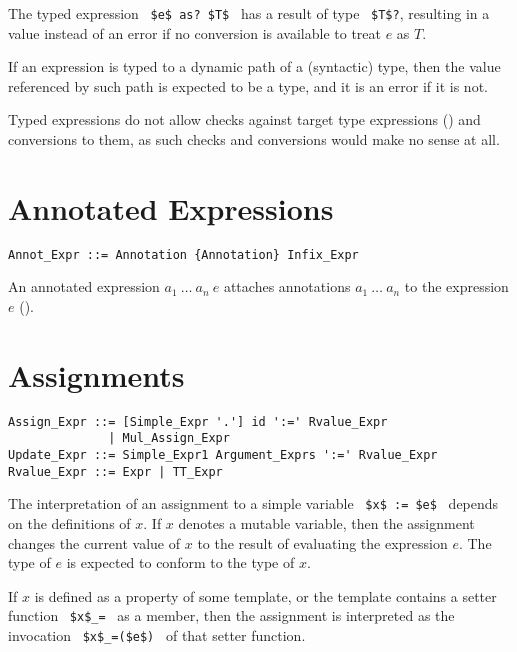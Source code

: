 The typed expression ~\lstinline!$e$ as? $T$!~ has a result of type ~\lstinline!$T$?!, resulting in a  value instead of an error if no conversion is available to treat $e$ as $T$. 

If an expression is typed to a dynamic path of a (syntactic) type, then the value referenced by such path is expected to be a type, and it is an error if it is not. 

Typed expressions do not allow checks against target type expressions () and conversions to them, as such checks and conversions would make no sense at all. 






\section{Annotated Expressions}
\label{sec:annotated-exprs}

\syntax\begin{lstlisting}
Annot_Expr ::= Annotation {Annotation} Infix_Expr
\end{lstlisting}

An annotated expression $a_1\ \ldots\ a_n\ e$ attaches annotations $a_1\ \ldots\ a_n$ to the expression $e$ (). 






\section{Assignments}

\syntax\begin{lstlisting}
Assign_Expr ::= [Simple_Expr '.'] id ':=' Rvalue_Expr
              | Mul_Assign_Expr
Update_Expr ::= Simple_Expr1 Argument_Exprs ':=' Rvalue_Expr
Rvalue_Expr ::= Expr | TT_Expr
\end{lstlisting}

The interpretation of an assignment to a simple variable ~\lstinline!$x$ := $e$!~ depends on the definitions of $x$. If $x$ denotes a mutable variable, then the assignment changes the current value of $x$ to the result of evaluating the expression $e$. The type of $e$ is expected to conform to the type of $x$. 

If $x$ is defined as a property of some template, or the template contains a setter function ~\lstinline!$x$_=!~ as a member, then the assignment is interpreted as the invocation ~\lstinline!$x$_=($e$)!~ of that setter function. 

